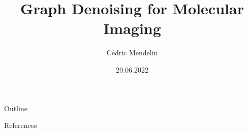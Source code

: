 \documentclass[aspectratio=169]{beamer}
\title              {Graph Denoising for Molecular Imaging}
\author     		{Cédric Mendelin}
\institute          {Department of Mathematics and Computer Science, University of Basel}
\date               {29.06.2022}
\begin{document}

\begin{frame}[t,plain]
    \titlepage
\end{frame}

\begin{frame}[t]{Outline}
    \tableofcontents
\end{frame}












\backupbegin

\begin{frame}{References}
    \printbibliography
\end{frame}

\backupend
\end{document}
